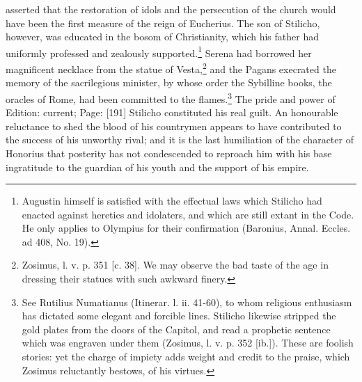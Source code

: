 asserted that the restoration of idols and the persecution of the church would have been the first measure of the reign of Eucherius. The son of Stilicho, however, was educated in the bosom of Christianity, which his father had uniformly professed and zealously supported.\footnote{Augustin himself is satisfied with the effectual laws which Stilicho had enacted against heretics and idolaters, and which are still extant in the Code. He only applies to Olympius for their confirmation (Baronius, Annal. Eccles. ad 408, No. 19).} Serena had borrowed her magnificent necklace from the statue of Vesta,\footnote{Zosimus, l. v. p. 351 [c. 38]. We may observe the bad taste of the age in dressing their statues with such awkward finery.} and the Pagans execrated the memory of the sacrilegious minister, by whose order the Sybilline books, the oracles of Rome, had been committed to the flames.\footnote{See Rutilius Numatianus (Itinerar. l. ii. 41-60), to whom religious enthusiasm has dictated some elegant and forcible lines. Stilicho likewise stripped the gold plates from the doors of the Capitol, and read a prophetic sentence which was engraven under them (Zosimus, l. v. p. 352 [ib.]). These are foolish stories: yet the charge of impiety adds weight and credit to the praise, which Zosimus reluctantly bestows, of his virtues.} The pride and power of Edition: current; Page: [191] Stilicho constituted his real guilt. An honourable reluctance to shed the blood of his countrymen appears to have contributed to the success of his unworthy rival; and it is the last humiliation of the character of Honorius that posterity has not condescended to reproach him with his base ingratitude to the guardian of his youth and the support of his empire.

